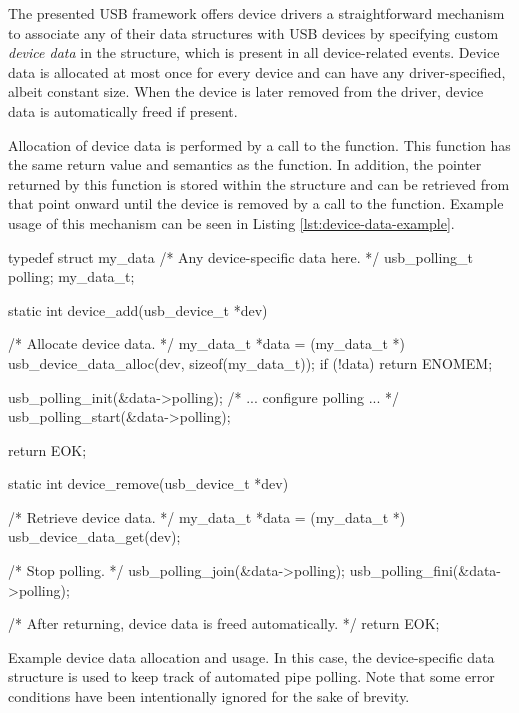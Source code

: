 The presented USB framework offers device drivers a straightforward mechanism to
associate any of their data structures with USB devices by specifying custom
\textit{device data} in the  structure, which is present in
all device-related events. Device data is allocated at most once for every
device and can have any driver-specified, albeit constant size. When the device
is later removed from the driver, device data is automatically freed if present.

Allocation of device data is performed by a call to the
 function. This function has the same return value
and semantics as the  function. In addition, the pointer returned by
this function is stored within the  structure and can be
retrieved from that point onward until the device is removed by a call to the
 function. Example usage of this mechanism can be seen
in Listing \ref{lst:device-data-example}.

\begin{listing}
	\begin{code}
		typedef struct my_data {
			/* Any device-specific data here. */
			usb_polling_t polling;
		} my_data_t;

		static int device_add(usb_device_t *dev)
		{
			/* Allocate device data. */
			my_data_t *data = (my_data_t *) usb_device_data_alloc(dev, sizeof(my_data_t));
			if (!data) {
				return ENOMEM;
			}

			usb_polling_init(&data->polling);
			/* ... configure polling ... */
			usb_polling_start(&data->polling);

			return EOK;
		}

		static int device_remove(usb_device_t *dev)
		{
			/* Retrieve device data. */
			my_data_t *data = (my_data_t *) usb_device_data_get(dev);

			/* Stop polling. */
			usb_polling_join(&data->polling);
			usb_polling_fini(&data->polling);

			/* After returning, device data is freed automatically. */
			return EOK;
		}
	\end{code}
	\caption[Example device data allocation and usage.]{Example device data
	allocation and usage. In this case, the  device-specific
	data structure is used to keep track of automated pipe polling. Note that
	some error conditions have been intentionally ignored for the sake of brevity.}
	\label{lst:device-data-example}
\end{listing}


